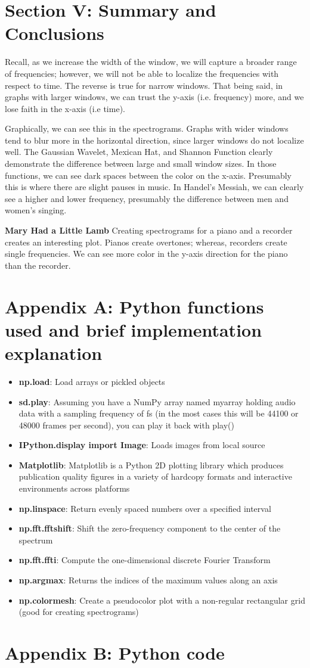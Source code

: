\documentclass{cup-pan}
\begin{document}
\section{Section V: Summary and Conclusions}
Recall, as we increase the width of the window, we will capture a broader range of frequencies; however, we will not be able to localize the frequencies with respect to time.  The reverse is true for narrow windows.  That being said, in graphs with larger windows, we can trust the y-axis (i.e. frequency) more, and we lose faith in the x-axis (i.e time).  

\vskip 0.1in
\noindent
Graphically, we can see this in the spectrograms.  Graphs with wider windows tend to blur more in the horizontal direction, since larger windows do not localize well.  The Gaussian Wavelet, Mexican Hat, and Shannon Function clearly demonstrate the difference between large and small window sizes.  In those functions, we can see dark spaces between the color on the x-axis. Presumably this is where there are slight pauses in music.  In Handel's Messiah, we can clearly see a higher and lower frequency, presumably the difference between men and women's singing. 

\vskip 0.1in
\noindent
\textbf{Mary Had a Little Lamb}
Creating spectrograms for a piano and a recorder creates an interesting plot.  Pianos create overtones; whereas, recorders create single frequencies.  We can see more color in the y-axis direction for the piano than the recorder.   

\section{Appendix A: Python functions used and brief implementation explanation}
\begin{itemize}
\item \textbf{np.load}: Load arrays or pickled objects   
\item \textbf{sd.play}: Assuming you have a NumPy array named myarray holding audio data with a sampling frequency of fs (in the most cases this will be 44100 or 48000 frames per second), you can play it back with play()  
\item \textbf{IPython.display import Image}: Loads images from local source  
\item \textbf{Matplotlib}: Matplotlib is a Python 2D plotting library which produces publication quality figures in a variety of hardcopy formats and interactive environments across platforms  
\item \textbf{np.linspace}: Return evenly spaced numbers over a specified interval  
\item \textbf{np.fft.fftshift}: Shift the zero-frequency component to the center of the spectrum  
\item \textbf{np.fft.ffti}: Compute the one-dimensional discrete Fourier Transform  
\item \textbf{np.argmax}: Returns the indices of the maximum values along an axis  
\item \textbf{np.colormesh}: Create a pseudocolor plot with a non-regular rectangular grid (good for creating spectrograms)
\end{itemize}

\section{Appendix B: Python code}
\end{document}
